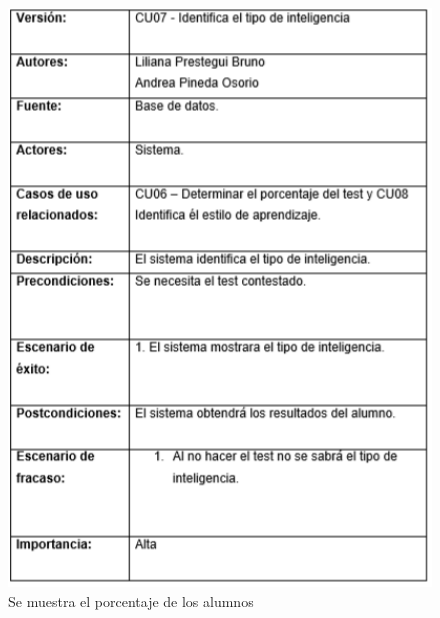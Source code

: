 \documentclass[letterpaper,oneside,openany,11pt]{book}
\begin{document}
\begin{figure}[H]
	\centering
	\includegraphics[width=1.0\textwidth]{./Imagenes/19}
	\caption{Se muestra el porcentaje de los alumnos}
\end{figure}
\end{document}
